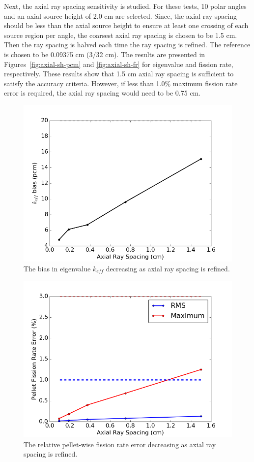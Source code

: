 Next, the axial ray spacing sensitivity is studied. For these tests, 10 polar angles and an axial source height of 2.0 cm are selected. Since, the axial ray spacing should be less than the axial source height to ensure at least one crossing of each source region per angle, the coarsest axial ray spacing is chosen to be 1.5 cm. Then the ray spacing is halved each time the ray spacing is refined. The reference is chosen to be 0.09375 cm (3/32 cm). The results are presented in Figures~\ref{fig:axial-sh-pcm} and \ref{fig:axial-sh-fr} for eigenvalue and fission rate, respectively. These results show that 1.5 cm axial ray spacing is sufficient to satisfy the accuracy criteria. However, if less than 1.0\% maximum fission rate error is required, the axial ray spacing would need to be 0.75 cm.

\begin{figure}[h!]
	\centering
	\includegraphics[width=0.7\linewidth]{figures/results/sensitivity/z_spacing_pcm.png}
	\caption[]{The bias in eigenvalue $k_{\textit{eff}}$ decreasing as axial ray spacing is refined.}
	\label{fig:axial-rs-pcm}
\end{figure}
\begin{figure}[h!]
	\centering
	\includegraphics[width=0.7\linewidth]{figures/results/sensitivity/z_spacing_fr.png}
	\caption[]{The relative pellet-wise fission rate error decreasing as axial ray spacing is refined.}
	\label{fig:axial-rs-fr}
\end{figure}

